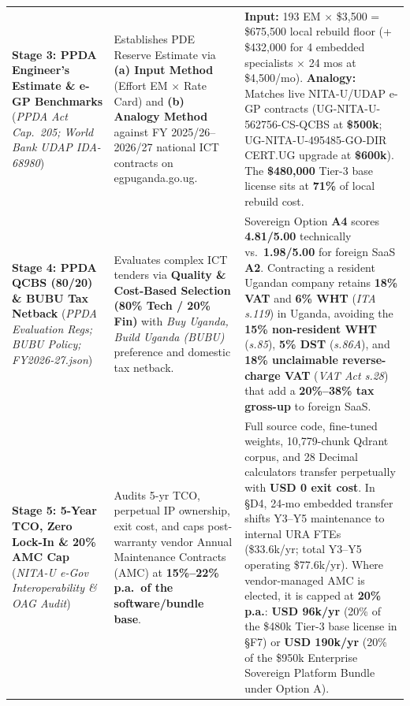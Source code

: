 \documentclass[10pt,a4paper]{article}
\newcommand{\docref}[1]{{\datafont\fontsize{8}{9}\selectfont\textcolor{inkii}{#1}}}
\newcommand{\code}[1]{{\datafont\fontsize{8.2}{9}\selectfont\textcolor{inkii}{#1}}}
\begin{document}
\begin{longtable}{>{\RaggedRight\arraybackslash}p{35mm}>{\RaggedRight\arraybackslash}p{41mm}>{\RaggedRight\arraybackslash}p{63.6mm}}
\addlinespace[0.4mm]
\textbf{Stage 3: PPDA Engineer's Estimate \& \code{e-GP} Benchmarks} (\emph{PPDA Act Cap.\ 205; World Bank UDAP \code{IDA-68980}}) & Establishes PDE Reserve Estimate via \textbf{(a) Input Method} (\code{Effort EM $\times$ Rate Card}) and \textbf{(b) Analogy Method} against FY 2025/26--2026/27 national ICT contracts on \code{egpuganda.go.ug}. & \textbf{Input:} \code{193 EM $\times$ \$3,500 = \$675,500} local rebuild floor (+ \code{\$432,000} for 4 embedded specialists $\times$ 24 mos at \code{\$4,500/mo}). \textbf{Analogy:} Matches live NITA-U/UDAP \code{e-GP} contracts (\code{UG-NITA-U-562756-CS-QCBS} at \textbf{\$500k}; \code{UG-NITA-U-495485-GO-DIR} CERT.UG upgrade at \textbf{\$600k}). The \textbf{\$480,000} Tier-3 base license sits at \textbf{71\%} of local rebuild cost. \\
\addlinespace[0.4mm]
\textbf{Stage 4: PPDA QCBS (80/20) \& BUBU Tax Netback} (\emph{PPDA Evaluation Regs; BUBU Policy; \code{FY2026-27.json}}) & Evaluates complex ICT tenders via \textbf{Quality \& Cost-Based Selection (80\% Tech / 20\% Fin)} with \emph{Buy Uganda, Build Uganda (BUBU)} preference and domestic tax netback. & Sovereign Option \textbf{A4} scores \textbf{4.81/5.00} technically vs.\ \textbf{1.98/5.00} for foreign SaaS \textbf{A2}. Contracting a resident Ugandan company retains \textbf{18\% VAT} and \textbf{6\% WHT} (\emph{ITA s.119}) in Uganda, avoiding the \textbf{15\% non-resident WHT} (\emph{s.85}), \textbf{5\% DST} (\emph{s.86A}), and \textbf{18\% unclaimable reverse-charge VAT} (\emph{VAT Act s.28}) that add a \textbf{20\%--38\% tax gross-up} to foreign SaaS. \\
\addlinespace[0.4mm]
\textbf{Stage 5: 5-Year TCO, Zero Lock-In \& 20\% AMC Cap} (\emph{NITA-U e-Gov Interoperability \& OAG Audit}) & Audits 5-yr TCO, perpetual IP ownership, exit cost, and caps post-warranty vendor Annual Maintenance Contracts (AMC) at \textbf{15\%--22\% p.a.\ of the software/bundle base}. & Full source code, fine-tuned weights, 10,779-chunk Qdrant corpus, and 28 \code{Decimal} calculators transfer perpetually with \textbf{USD 0 exit cost}. In \docref{§D4}, 24-mo embedded transfer shifts Y3--Y5 maintenance to internal URA FTEs (\code{\$33.6k/yr}; total Y3--Y5 operating \code{\$77.6k/yr}). Where vendor-managed AMC is elected, it is capped at \textbf{20\% p.a.}: \textbf{USD 96k/yr} (\code{20\%} of the \code{\$480k} Tier-3 base license in \docref{§F7}) or \textbf{USD 190k/yr} (\code{20\%} of the \code{\$950k} Enterprise Sovereign Platform Bundle under Option A). \\

\end{longtable}
\end{document}
